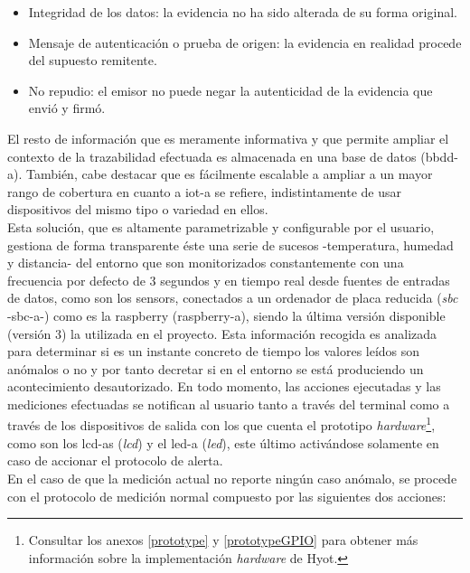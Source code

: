 \documentclass[12pt,a4paper, twoside]{report}
\begin{document}
	\begin{itemize}
		\item Integridad de los datos: la evidencia no ha sido alterada de su forma original.
		\item Mensaje de autenticación o prueba de origen: la evidencia en realidad procede del supuesto remitente.
		\item No repudio: el emisor no puede negar la autenticidad de la evidencia que envió y firmó.
	\end{itemize}
		
	El resto de información que es meramente informativa y que permite ampliar el contexto de la trazabilidad efectuada es almacenada en una base de datos (\gls{bbdd-a}). También, cabe destacar que es fácilmente escalable a ampliar a un mayor rango de cobertura en cuanto a \gls{iot-a} se refiere, indistintamente de usar dispositivos del mismo tipo o variedad en ellos. \\
	
	Esta solución, que es altamente parametrizable y configurable por el usuario, gestiona de forma transparente éste una serie de sucesos -temperatura, humedad y distancia- del entorno que son monitorizados constantemente con una frecuencia por defecto de 3 segundos y en tiempo real desde fuentes de entradas de datos, como son los \glspl{sensor}, conectados a un ordenador de placa reducida (\textit{\gls{sbc}} -\gls{sbc-a}-) como es la \gls{raspberry} (\gls{raspberry-a}), siendo la última versión disponible (versión 3) la utilizada en el proyecto. Esta información recogida es analizada para determinar si es un instante concreto de tiempo los valores leídos son anómalos o no y por tanto decretar si en el entorno se está produciendo un acontecimiento desautorizado. En todo momento, las acciones ejecutadas y las mediciones efectuadas se notifican al usuario tanto a través del terminal como a través de los dispositivos de salida con los que cuenta el \gls{prototipo} \textit{hardware}\footnote{Consultar los anexos \ref{prototype} y \ref{prototypeGPIO} para obtener más información sobre la implementación \textit{hardware} de Hyot.}, como son los \glspl{lcd-a} (\textit{\gls{lcd}}) y el \gls{led-a} (\textit{\gls{led}}), este último activándose solamente en caso de accionar el protocolo de alerta. \\	
	
	En el caso de que la medición actual no reporte ningún caso anómalo, se procede con el protocolo de medición normal compuesto por las siguientes dos acciones:
	
\end{document}
